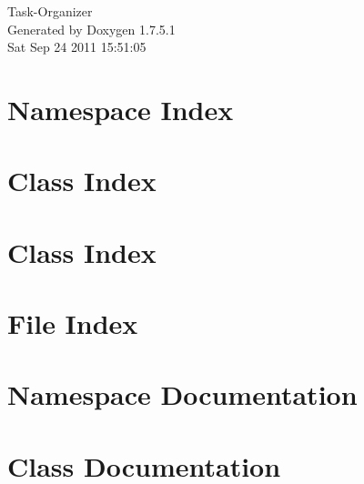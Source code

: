 \documentclass[a4paper]{book}
\begin{document}
\hypersetup{pageanchor=false,citecolor=blue}
\begin{titlepage}
\vspace*{7cm}
\begin{center}
{\Large \-Task-\/\-Organizer }\\
\vspace*{1cm}
{\large \-Generated by Doxygen 1.7.5.1}\\
\vspace*{0.5cm}
{\small Sat Sep 24 2011 15:51:05}\\
\end{center}
\end{titlepage}
\clearemptydoublepage
{}
\tableofcontents
\clearemptydoublepage
{}
\hypersetup{pageanchor=true,citecolor=blue}
\chapter{\-Namespace \-Index}

\chapter{\-Class \-Index}

\chapter{\-Class \-Index}

\chapter{\-File \-Index}

\chapter{\-Namespace \-Documentation}











\chapter{\-Class \-Documentation}























\end{document}
